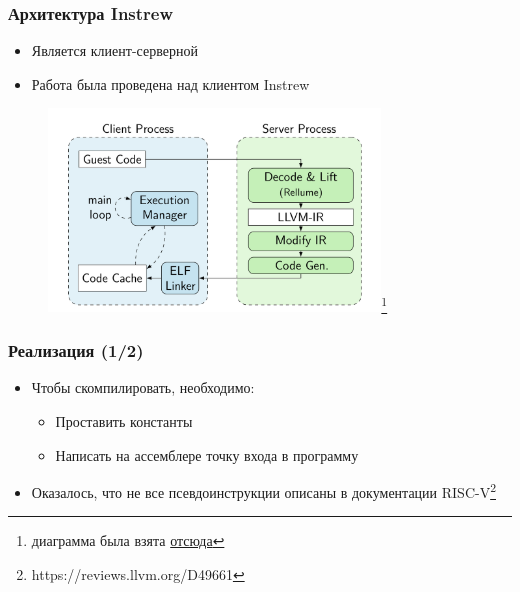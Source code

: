 \documentclass{beamer}
\begin{document}
\begin{frame}[fragile]
  \frametitle{Архитектура Instrew}
  \begin{itemize}
    \item Является клиент-серверной
    \item Работа была проведена над клиентом Instrew
  \end{itemize}
  \begin{figure}
    \centering
    \includegraphics[width=250pt]{pictures/instrew-arch-disser.png}\footnote{диаграмма была взята \href{https://mediatum.ub.tum.de/doc/1614897/1614897.pdf}{отсюда}}
  \end{figure}
\end{frame}

\begin{frame}[fragile]
  \frametitle{Реализация (1/2)}
  \begin{itemize}
    \item Чтобы скомпилировать, необходимо:
          \begin{itemize}
            \item Проставить константы
            \item Написать на ассемблере точку входа в программу
          \end{itemize}
    \item Оказалось, что не все псевдоинструкции описаны в документации RISC-V\footnote{https://reviews.llvm.org/D49661}
  \end{itemize}
\end{frame}
\end{document}
